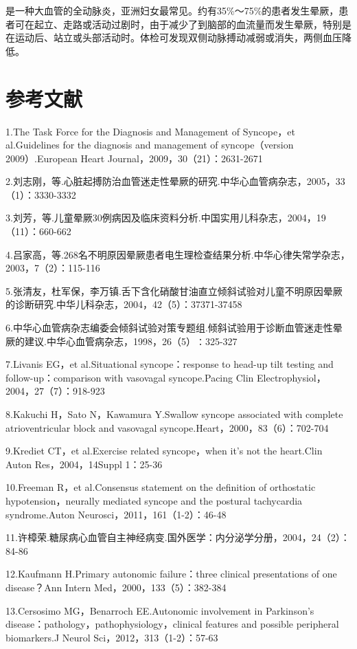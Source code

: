是一种大血管的全动脉炎，亚洲妇女最常见。约有35\%～75\%的患者发生晕厥，患者可在起立、走路或活动过剧时，由于减少了到脑部的血流量而发生晕厥，特别是在运动后、站立或头部活动时。体检可发现双侧动脉搏动减弱或消失，两侧血压降低。

\protect\hypertarget{text00368.html}{}{}

\section{参考文献}

1.The Task Force for the Diagnosis and Management of Syncope，et
al.Guidelines for the diagnosis and management of syncope（version
2009）.European Heart Journal，2009，30（21）：2631-2671

2.刘志刚，等.心脏起搏防治血管迷走性晕厥的研究.中华心血管病杂志，2005，33（1）：3330-3332

3.刘芳，等.儿童晕厥30例病因及临床资料分析.中国实用儿科杂志，2004，19（11）：660-662

4.吕家高，等.268名不明原因晕厥患者电生理检查结果分析.中华心律失常学杂志，2003，7（2）：115-116

5.张清友，杜军保，李万镇.舌下含化硝酸甘油直立倾斜试验对儿童不明原因晕厥的诊断研究.中华儿科杂志，2004，42（5）：37371-37458

6.中华心血管病杂志编委会倾斜试验对策专题组.倾斜试验用于诊断血管迷走性晕厥的建议.中华心血管病杂志，1998，26（5）∶325-327

7.Livanis EG，et al.Situational syncope：response to head-up tilt
testing and follow-up：comparison with vasovagal syncope.Pacing Clin
Electrophysiol，2004，27（7）：918-923

8.Kakuchi H，Sato N，Kawamura Y.Swallow syncope associated with complete
atrioventricular block and vasovagal
syncope.Heart，2000，83（6）：702-704

9.Krediet CT，et al.Exercise related syncope，when it's not the
heart.Clin Auton Res，2004，14Suppl 1：25-36

10.Freeman R，et al.Consensus statement on the definition of orthostatic
hypotension，neurally mediated syncope and the postural tachycardia
syndrome.Auton Neurosci，2011，161（1-2）：46-48

11.许樟荣.糖尿病心血管自主神经病变.国外医学：内分泌学分册，2004，24（2）：84-86

12.Kaufmann H.Primary autonomic failure：three clinical presentations of
one disease？Ann Intern Med，2000，133（5）：382-384

13.Cersosimo MG，Benarroch EE.Autonomic involvement in Parkinson's
disease：pathology，pathophysiology，clinical features and possible
peripheral biomarkers.J Neurol Sci，2012，313（1-2）：57-63

